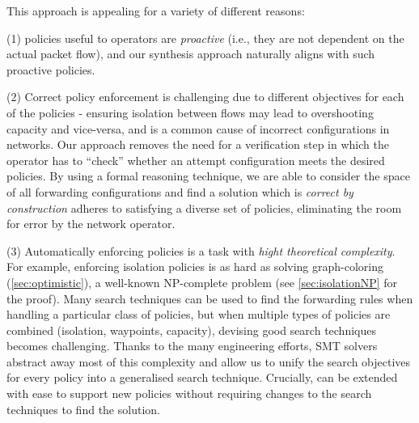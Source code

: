 This approach is appealing for a variety of different reasons: 

(1)
policies useful to operators are \emph{proactive} (i.e., they are not
dependent on the actual packet flow), and our synthesis approach
naturally aligns with such proactive policies.


(2) Correct policy enforcement is challenging due to different
objectives for each of the policies - ensuring isolation between flows
may lead to overshooting capacity and vice-versa, and is a common
cause of incorrect configurations in networks. 
Our approach removes the need for a verification step in which the operator
has to ``check'' whether an attempt configuration meets the desired policies.
By using a formal
reasoning technique, we are able to consider the space of all
forwarding configurations and find a solution which 
is \emph{correct by construction}
adheres to
satisfying a diverse set of policies, eliminating the room for error
by the network operator. 

(3) Automatically enforcing policies is a task with
\emph{hight theoretical complexity}. 
For example, enforcing isolation policies
is as hard as solving
graph-coloring (\cref{sec:optimistic}), a well-known
NP-complete problem (see \cref{sec:isolationNP} for the proof).
Many  search
techniques can be used to find the forwarding rules when handling
a particular class of policies, 
but when multiple types of policies are combined (isolation, waypoints, capacity),
devising good search techniques becomes challenging. 
Thanks to the many engineering efforts, SMT solvers abstract away
most of this complexity and allow us
 to unify the search objectives for every policy into a generalised
search technique. 
Crucially, \Name can be extended with ease to
support new policies without requiring changes to the search
techniques to find the solution.

